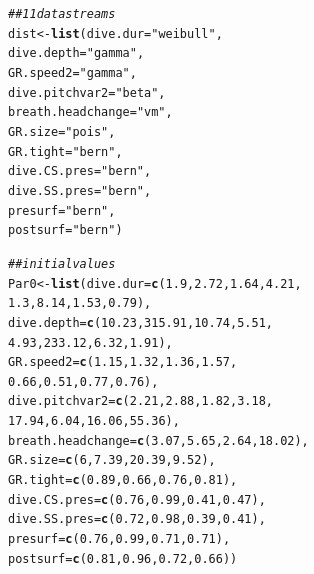 \documentclass[12pt]{article}\usepackage[]{graphicx}\usepackage[]{xcolor}
\makeatletter
\newcommand{\hlnum}[1]{\textcolor[rgb]{0.686,0.059,0.569}{#1}}%
\newcommand{\hlsng}[1]{\textcolor[rgb]{0.192,0.494,0.8}{#1}}%
\newcommand{\hlcom}[1]{\textcolor[rgb]{0.678,0.584,0.686}{\textit{#1}}}%
\newcommand{\hldef}[1]{\textcolor[rgb]{0.345,0.345,0.345}{#1}}%
\newcommand{\hlkwb}[1]{\textcolor[rgb]{0.69,0.353,0.396}{#1}}%
\newcommand{\hlkwc}[1]{\textcolor[rgb]{0.333,0.667,0.333}{#1}}%
\newcommand{\hlkwd}[1]{\textcolor[rgb]{0.737,0.353,0.396}{\textbf{#1}}}%
\newenvironment{kframe}{%
 \def\at@end@of@kframe{}%
 \ifinner\ifhmode%
  \def\at@end@of@kframe{\end{minipage}}%
  \begin{minipage}{\columnwidth}%
 \fi\fi%
 \def\FrameCommand##1{\hskip\@totalleftmargin \hskip-\fboxsep
 \colorbox{shadecolor}{##1}\hskip-\fboxsep
     \hskip-\linewidth \hskip-\@totalleftmargin \hskip\columnwidth}%
 \MakeFramed {\advance\hsize-\width
   \@totalleftmargin\z@ \linewidth\hsize
   \@setminipage}}%
 {\par\unskip\endMakeFramed%
 \at@end@of@kframe}
\newenvironment{knitrout}{}{} %
\makeatother
\begin{document}
\begin{knitrout}
\color{fgcolor}\begin{kframe}
\begin{alltt}
\hlcom{## 11 data streams}
\hldef{dist} \hlkwb{<-} \hlkwd{list}\hldef{(}\hlkwc{dive.dur} \hldef{=} \hlsng{"weibull"}\hldef{,}
             \hlkwc{dive.depth} \hldef{=} \hlsng{"gamma"}\hldef{,}
             \hlkwc{GR.speed2} \hldef{=} \hlsng{"gamma"}\hldef{,}
             \hlkwc{dive.pitchvar2} \hldef{=} \hlsng{"beta"}\hldef{,}
             \hlkwc{breath.headchange} \hldef{=} \hlsng{"vm"}\hldef{,}
             \hlkwc{GR.size} \hldef{=} \hlsng{"pois"}\hldef{,}
             \hlkwc{GR.tight} \hldef{=} \hlsng{"bern"}\hldef{,}
             \hlkwc{dive.CS.pres} \hldef{=} \hlsng{"bern"}\hldef{,}
             \hlkwc{dive.SS.pres} \hldef{=} \hlsng{"bern"}\hldef{,}
             \hlkwc{presurf} \hldef{=} \hlsng{"bern"}\hldef{,}
             \hlkwc{postsurf} \hldef{=} \hlsng{"bern"}\hldef{)}

\hlcom{## initial values}
\hldef{Par0} \hlkwb{<-} \hlkwd{list}\hldef{(}\hlkwc{dive.dur} \hldef{=} \hlkwd{c}\hldef{(}\hlnum{1.9}\hldef{,} \hlnum{2.72}\hldef{,} \hlnum{1.64}\hldef{,} \hlnum{4.21}\hldef{,}
                          \hlnum{1.3}\hldef{,} \hlnum{8.14}\hldef{,} \hlnum{1.53}\hldef{,} \hlnum{0.79}\hldef{),}
             \hlkwc{dive.depth} \hldef{=} \hlkwd{c}\hldef{(}\hlnum{10.23}\hldef{,} \hlnum{315.91}\hldef{,} \hlnum{10.74}\hldef{,} \hlnum{5.51}\hldef{,}
                             \hlnum{4.93}\hldef{,} \hlnum{233.12}\hldef{,}  \hlnum{6.32}\hldef{,} \hlnum{1.91}\hldef{),}
             \hlkwc{GR.speed2} \hldef{=} \hlkwd{c}\hldef{(}\hlnum{1.15}\hldef{,} \hlnum{1.32}\hldef{,} \hlnum{1.36}\hldef{,} \hlnum{1.57}\hldef{,}
                           \hlnum{0.66}\hldef{,} \hlnum{0.51}\hldef{,} \hlnum{0.77}\hldef{,} \hlnum{0.76}\hldef{),}
             \hlkwc{dive.pitchvar2} \hldef{=} \hlkwd{c}\hldef{(} \hlnum{2.21}\hldef{,} \hlnum{2.88}\hldef{,}  \hlnum{1.82}\hldef{,}  \hlnum{3.18}\hldef{,}
                                \hlnum{17.94}\hldef{,} \hlnum{6.04}\hldef{,} \hlnum{16.06}\hldef{,} \hlnum{55.36}\hldef{),}
             \hlkwc{breath.headchange} \hldef{=} \hlkwd{c}\hldef{(}\hlnum{3.07}\hldef{,} \hlnum{5.65}\hldef{,} \hlnum{2.64}\hldef{,} \hlnum{18.02}\hldef{),}
             \hlkwc{GR.size} \hldef{=} \hlkwd{c}\hldef{(}\hlnum{6}\hldef{,} \hlnum{7.39}\hldef{,} \hlnum{20.39}\hldef{,} \hlnum{9.52}\hldef{),}
             \hlkwc{GR.tight} \hldef{=} \hlkwd{c}\hldef{(}\hlnum{0.89}\hldef{,} \hlnum{0.66}\hldef{,} \hlnum{0.76}\hldef{,} \hlnum{0.81}\hldef{),}
             \hlkwc{dive.CS.pres} \hldef{=} \hlkwd{c}\hldef{(}\hlnum{0.76}\hldef{,} \hlnum{0.99}\hldef{,} \hlnum{0.41}\hldef{,} \hlnum{0.47}\hldef{),}
             \hlkwc{dive.SS.pres} \hldef{=} \hlkwd{c}\hldef{(}\hlnum{0.72}\hldef{,} \hlnum{0.98}\hldef{,} \hlnum{0.39}\hldef{,} \hlnum{0.41}\hldef{),}
             \hlkwc{presurf} \hldef{=} \hlkwd{c}\hldef{(}\hlnum{0.76}\hldef{,} \hlnum{0.99}\hldef{,} \hlnum{0.71}\hldef{,} \hlnum{0.71}\hldef{),}
             \hlkwc{postsurf} \hldef{=} \hlkwd{c}\hldef{(}\hlnum{0.81}\hldef{,} \hlnum{0.96}\hldef{,} \hlnum{0.72}\hldef{,} \hlnum{0.66}\hldef{))}


\end{alltt}
\end{kframe}
\end{knitrout}
\end{document}
